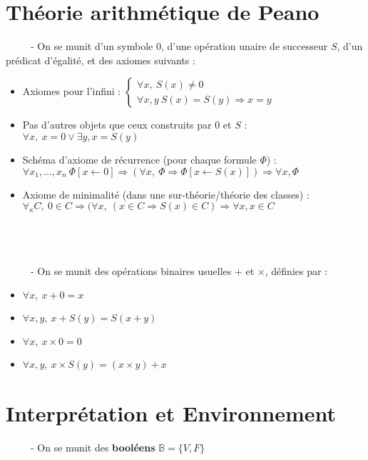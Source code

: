 \documentclass[11pt,a4paper]{article}
\begin{document}
\section{Théorie arithmétique de Peano}

\ \ \ \ \ - On se munit d'un symbole $0$, d'une opération unaire de successeur $S$, d'un prédicat d'égalité, et des axiomes suivants :
\begin{itemize}
\item Axiomes pour l'infini : $\begin{cases} \forall x, \ S(x) \neq 0 \\ \forall x,y \ S(x)=S(y) \Rightarrow x=y \end{cases}$
\item Pas d'autres objets que ceux construits par 0 et $S$ : $ \forall x, \ x=0 \lor \exists y,  x=S(y)$
\item Schéma d'axiome de récurrence (pour chaque formule $\Phi$) : \\
$ \forall x_1,\dots,x_n \ \Phi[x\leftarrow 0] \Rightarrow ( \forall x, \ \Phi \Rightarrow \Phi[x\leftarrow S(x)]) \Rightarrow \forall x, \Phi$
\item Axiome de minimalité (dans une sur-théorie/théorie des classes) : \\
$\forall_\kappa C, \ 0 \in C \Rightarrow ( \forall x, \ (x \in C \Rightarrow S(x) \in C) \Rightarrow \forall x, x \in C$
\\
\\
\\
\\
\end{itemize} 
\ \ \ \ \ - On se munit des opérations binaires usuelles $+$ et $\times$, définies par :
\begin{itemize}
\item $\forall x, \ x + 0 = x$
\item $\forall x,y, \ x+S(y)=S(x+y)$
\item $\forall x, \ x \times 0 = 0$
\item $\forall x,y, \ x\times S(y)=(x \times y)+ x$

\end{itemize}  


\section{Interprétation et Environnement}

\ \ \ \ \ - On se munit des \textbf{booléens} $\mathbb{B} = \{V, F \}$ \\
\end{document}
